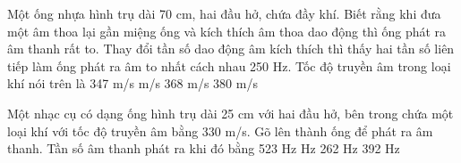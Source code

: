 \begin{ex}%
Một ống nhựa hình trụ dài 70 cm, hai đầu hở, chứa đầy khí. Biết rằng khi đưa một âm thoa lại gần miệng ống và kích thích âm thoa dao động thì ống phát ra âm thanh rất to. Thay đổi tần số dao động âm kích thích thì thấy hai tần số liên tiếp làm ống phát ra âm to nhất cách nhau 250 Hz. Tốc độ truyền âm trong loại khí nói trên là
\choice
{347 m/s}
{ m/s}
{368 m/s}
{380 m/s}
\end{ex} 
\begin{ex}%
Một nhạc cụ có dạng ống hình trụ dài 25 cm với hai đầu hở, bên trong chứa một loại khí với tốc độ truyền âm bằng 330 m/s. Gõ lên thành ống để phát ra âm thanh. Tần số âm thanh phát ra khi đó bằng
\choice
{523 Hz}
{ Hz}
{262 Hz}
{392 Hz}
\end{ex} 
